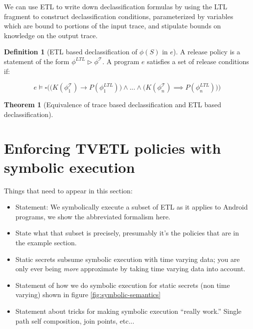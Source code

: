 \documentclass{sig-alternate}
\theoremstyle{definition}
\newtheorem{defn}{Definition}[section]
\newtheorem{thm}{Theorem}[section]
\newcommand{\talways}{\square}
\begin{document}
{We can use ETL to write down declassification formulas by using the
LTL fragment to construct declassification conditions, parameterized
by variables which are bound to portions of the input trace, and
stipulate bounds on knowledge on the output trace.

\begin{defn}[ETL based declassification of $\phi(S)$ in $e$]
  A release policy is a statement of the form $\phi^{LTL} \rhd
  \phi^{\mathcal{T}}$.  A program $e$ satisfies a set of release
  conditions if: 
  
  \begin{displaymath}
    e \models \talways 
    \Big ( 
    \big(K(\phi_1^{\mathcal{T}}) \rightarrow   P (\phi_1^{LTL}) \big )
    \land ... \land \big( K(\phi_n^{\mathcal{T}}) \implies P
    (\phi_n^{LTL}) \big) \Big)
  \end{displaymath}
\end{defn}

\begin{thm}[Equivalence of trace based declassification and ETL based
  declassification]
\end{thm}

\section{Enforcing TVETL policies with symbolic execution}

Things that need to appear in this section:

\begin{itemize}
\item Statement: We symbolically execute a subset of ETL as it applies
  to Android programs, we show the abbreviated formalism here.

\item State what that subset is precisely, presumably it's the
  policies that are in the example section.

\item Static secrets subsume symbolic execution with time varying
  data; you are only ever being \emph{more} approximate by taking time
  varying data into account.

\item Statement of how we do symbolic execution for static secrets
  (non time varying) shown in figure \ref{fig:symbolic-semantics}

\item Statement about tricks for making symbolic execution ``really
  work.'' Single path self composition, join points, etc...


\end{itemize}}
\end{document}
